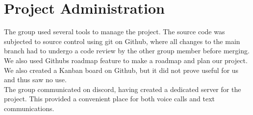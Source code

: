 \section{Project Administration}
The group used several tools to manage the project. The source code was subjected to source control using git on Github, where all changes to the main branch had to undergo a code review by the other group member before merging. We also used Githubs roadmap feature to make a roadmap and plan our project. We also created a Kanban board on Github, but it did not prove useful for us and thus saw no use.\\
The group communicated on discord, having created a dedicated server for the project. This provided a convenient place for both voice calls and text communications.  
